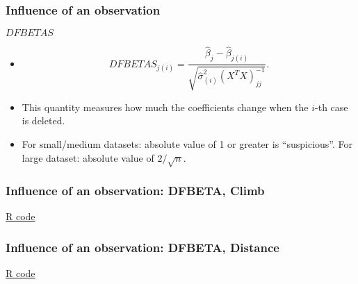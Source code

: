 \documentclass[handout]{beamer}
\begin{document}
   \begin{frame} \frametitle{Influence of an observation}

   \begin{block}
   {$DFBETAS$}
   \begin{itemize}[<+->]

   \item $$
   DFBETAS_{j(i)} = \frac{\widehat{\beta}_j - \widehat{\beta}_{j(i)}}{\sqrt{\widehat{\sigma}^2_{(i)} (X^TX)^{-1}_{jj}}}.$$

   \item This quantity measures how much the coefficients change when the $i$-th case is deleted.

   \item For small/medium datasets: absolute value of 1 or greater is ``suspicious''. For large dataset: absolute value of $2 /  \sqrt{n}$.

   \end{itemize}

   \end{block}
   \end{frame}



   \begin{frame}
   \frametitle{Influence of an observation: DFBETA, Climb}
   \begin{center}
   \end{center}
   \href{http://stats191.stanford.edu/diagnostics.html#dfbetas}{R code}
   \end{frame}



   \begin{frame}
   \frametitle{Influence of an observation: DFBETA, Distance}
   \begin{center}
   \end{center}
   \href{http://stats191.stanford.edu/diagnostics.html#dfbetas}{R code}
   \end{frame}

\end{document}
